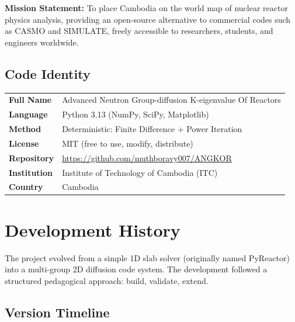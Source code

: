\documentclass[12pt,a4paper]{article}
\begin{document}
\begin{mdframed}[linecolor=angkorblue, linewidth=2pt]
\textbf{Mission Statement:} To place Cambodia on the world map of nuclear
reactor physics analysis, providing an open-source alternative to commercial
codes such as CASMO and SIMULATE, freely accessible to researchers,
students, and engineers worldwide.
\end{mdframed}

\subsection{Code Identity}

\begin{center}
\begin{tabular}{ll}
\toprule
\textbf{Full Name} & Advanced Neutron Group-diffusion K-eigenvalue Of Reactors \\
\textbf{Language} & Python 3.13 (NumPy, SciPy, Matplotlib) \\
\textbf{Method} & Deterministic: Finite Difference + Power Iteration \\
\textbf{License} & MIT (free to use, modify, distribute) \\
\textbf{Repository} & \url{https://github.com/muthboravy007/ANGKOR} \\
\textbf{Institution} & Institute of Technology of Cambodia (ITC) \\
\textbf{Country} & Cambodia \\ 
\bottomrule
\end{tabular}
\end{center}

\section{Development History}

The project evolved from a simple 1D slab solver (originally named PyReactor)
into a multi-group 2D diffusion code system. The development followed a
structured pedagogical approach: build, validate, extend.

\subsection{Version Timeline}
\end{document}
